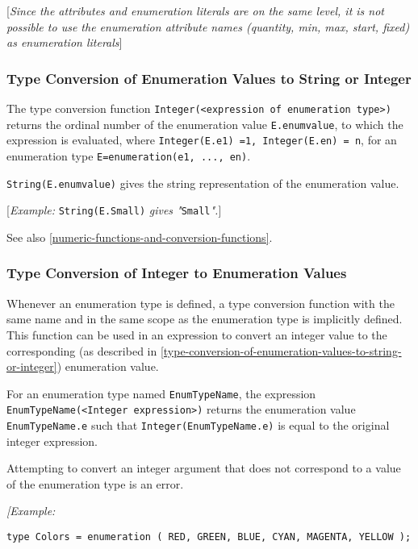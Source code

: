 {[}\emph{Since the attributes and enumeration literals are on the same
level, it is not possible to use the enumeration attribute names
(quantity, min, max, start, fixed) as enumeration literals}{]}

\subsubsection{Type Conversion of Enumeration Values to String or Integer}

The type conversion function \lstinline!Integer(<expression of enumeration type>)! returns the ordinal number of the
enumeration value \lstinline!E.enumvalue!, to which the expression is evaluated,
where \lstinline!Integer(E.e1) =1, Integer(E.en) = n!, for an enumeration type
\lstinline!E=enumeration(e1, ..., en)!.

\lstinline!String(E.enumvalue)! gives the string representation of the enumeration
value.

{[}\emph{Example:} \lstinline!String(E.Small)! \emph{gives
"}\lstinline!Small!\emph{".}{]}

See also \autoref{numeric-functions-and-conversion-functions}.

\subsubsection{Type Conversion of Integer to Enumeration Values}

Whenever an enumeration type is defined, a type conversion function with
the same name and in the same scope as the enumeration type is
implicitly defined. This function can be used in an expression to
convert an integer value to the corresponding (as described in \autoref{type-conversion-of-enumeration-values-to-string-or-integer}) enumeration value.

For an enumeration type named \lstinline!EnumTypeName!, the expression
\lstinline!EnumTypeName(<Integer expression>)! returns the
enumeration value \lstinline!EnumTypeName.e! such that \lstinline!Integer(EnumTypeName.e)! is
equal to the original integer expression.

Attempting to convert an integer argument that does not correspond to a
value of the enumeration type is an error.

\emph{{[}Example: }
\begin{lstlisting}[language=modelica]
type Colors = enumeration ( RED, GREEN, BLUE, CYAN, MAGENTA, YELLOW );
\end{lstlisting}

